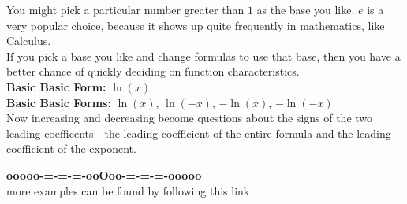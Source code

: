 \documentclass{ximera}
\begin{document}
You might pick a particular number greater than $1$ as the base you like.  $e$ is a very popular choice, because it shows up quite frequently in mathematics, like Calculus. \\











If you pick a base you like and change formulas to use that base, then you have a better chance of quickly deciding on function characteristics. \\



\textbf{\textcolor{blue!55!black}{Basic Basic Form:}}  $\ln(x)$ \\



\textbf{\textcolor{blue!55!black}{Basic Basic Forms:}}  $\ln(x)$, $\ln(-x)$, $-\ln(x)$, $-\ln(-x)$ \\


Now increasing and decreasing become questions about the signs of the two leading coefficents - the leading coefficient of the entire formula and the leading coefficient of the exponent.











\begin{center}
\textbf{\textcolor{green!50!black}{ooooo-=-=-=-ooOoo-=-=-=-ooooo}} \\

more examples can be found by following this link\\ 

\end{center}
\end{document}
